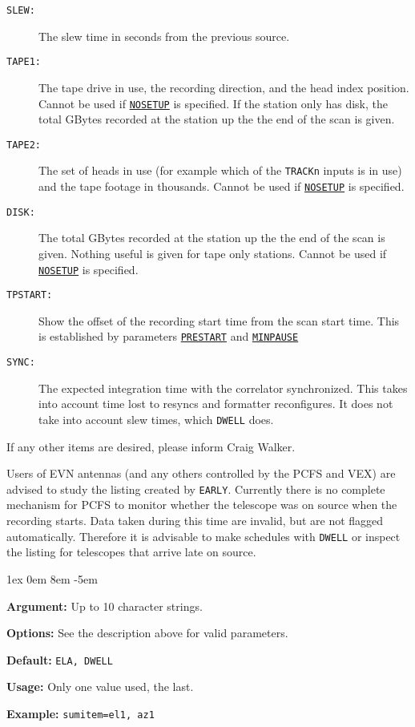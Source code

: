 \documentclass{report}
\newcommand{\rcwbox}[5]{
  \begin{list}{}{\parsep 1ex  \itemsep 0em
                 \leftmargin 8em  \itemindent -5em }
    \item {\bf Argument:} #1
    \item {\bf Options:}  #2
    \item {\bf Default:}  #3
    \item {\bf Usage:}    #4
    \item {\bf Example:}  #5
  \end{list}
}
\begin{document}
\begin{description}
\item[{\tt SLEW:}]  The slew time in seconds from the previous source.

\item[{\tt TAPE1:}]  The tape drive in use, the recording direction,
and the head index position.  Cannot be used if 
{\hyperref[MP:NOSETUP]{{\tt NOSETUP}}}
is specified.  If the station only has disk, the
total GBytes recorded at the station up the the end of the scan is
given.

\item[{\tt TAPE2:}]  The set of heads in use (for example which of the
{\tt TRACKn} inputs is in use) and the tape footage in thousands.
Cannot be used if 
{\hyperref[MP:NOSETUP]{{\tt NOSETUP}}} is specified.

\item[{\tt DISK:}] The total GBytes recorded at the station up the
the end of the scan is given.  Nothing useful is given for tape only
stations.  Cannot be used if 
{\hyperref[MP:NOSETUP]{{\tt NOSETUP}}} is
specified.

\item[{\tt TPSTART:}] Show the offset of the recording start time from the
scan start time.  This is established by parameters 
{\hyperref[MP:PRESTART]{{\tt PRESTART}}} and 
{\hyperref[MP:MINPAUSE]{{\tt MINPAUSE}}}

\item[{\tt SYNC:}]  The expected integration time with the correlator
synchronized.  This takes into account time lost to resyncs and
formatter reconfigures.  It does not take into account slew times, which
{\tt DWELL} does.

\end{description}

If any other items are desired, please inform Craig Walker.

Users of EVN antennas (and any others controlled by the PCFS and VEX)
are advised to study the listing created by {\tt EARLY}.  Currently
there is no complete mechanism for PCFS to monitor whether the
telescope was on source when the recording starts. Data taken
during this time are invalid, but are not flagged automatically.
Therefore it is advisable to make schedules with {\tt DWELL} or
inspect the listing for telescopes that arrive late on source.

\rcwbox
{Up to 10 character strings.}
{See the description above for valid parameters.}
{{\tt ELA, DWELL}}
{Only one value used, the last.}
{{\tt sumitem=el1, az1}}
\end{document}

